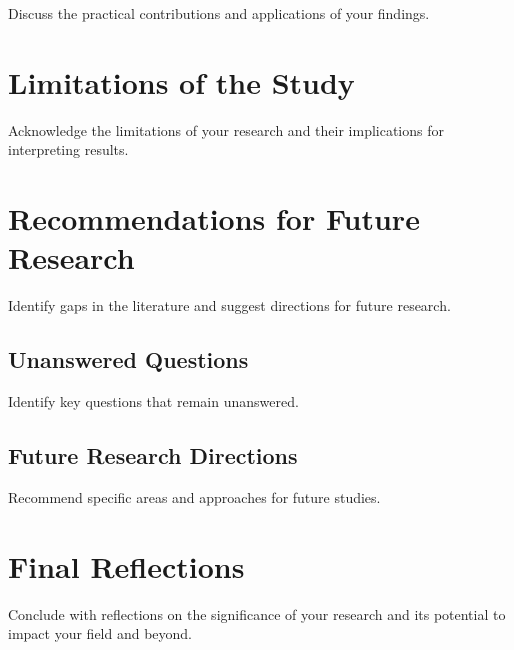 Discuss the practical contributions and applications of your findings.

\section{Limitations of the Study}

Acknowledge the limitations of your research and their implications for interpreting results.

\section{Recommendations for Future Research}

Identify gaps in the literature and suggest directions for future research.

\subsection{Unanswered Questions}

Identify key questions that remain unanswered.

\subsection{Future Research Directions}

Recommend specific areas and approaches for future studies.

\section{Final Reflections}

Conclude with reflections on the significance of your research and its potential to impact your field and beyond.

\newpage

